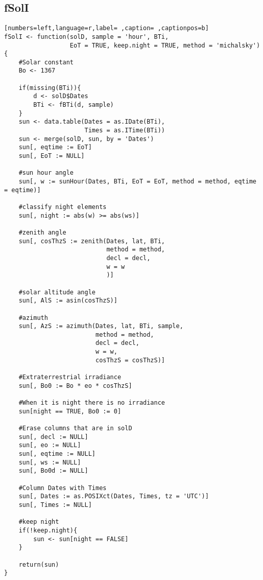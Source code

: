 \subsection{fSolI}
\label{sec:orgeeed9f3}
\begin{lstlisting}[numbers=left,language=r,label= ,caption= ,captionpos=b]
fSolI <- function(solD, sample = 'hour', BTi,
                  EoT = TRUE, keep.night = TRUE, method = 'michalsky')
{
    #Solar constant
    Bo <- 1367

    if(missing(BTi)){
        d <- solD$Dates
        BTi <- fBTi(d, sample)
    }
    sun <- data.table(Dates = as.IDate(BTi),
                      Times = as.ITime(BTi))
    sun <- merge(solD, sun, by = 'Dates')
    sun[, eqtime := EoT]
    sun[, EoT := NULL]

    #sun hour angle
    sun[, w := sunHour(Dates, BTi, EoT = EoT, method = method, eqtime = eqtime)]

    #classify night elements
    sun[, night := abs(w) >= abs(ws)]

    #zenith angle
    sun[, cosThzS := zenith(Dates, lat, BTi,
                            method = method,
                            decl = decl,
                            w = w
                            )]

    #solar altitude angle
    sun[, AlS := asin(cosThzS)]

    #azimuth
    sun[, AzS := azimuth(Dates, lat, BTi, sample,
                         method = method,
                         decl = decl, 
                         w = w,
                         cosThzS = cosThzS)]

    #Extraterrestrial irradiance
    sun[, Bo0 := Bo * eo * cosThzS]

    #When it is night there is no irradiance
    sun[night == TRUE, Bo0 := 0]

    #Erase columns that are in solD
    sun[, decl := NULL]
    sun[, eo := NULL]
    sun[, eqtime := NULL]
    sun[, ws := NULL]
    sun[, Bo0d := NULL]

    #Column Dates with Times
    sun[, Dates := as.POSIXct(Dates, Times, tz = 'UTC')]
    sun[, Times := NULL]

    #keep night
    if(!keep.night){
        sun <- sun[night == FALSE]
    }

    return(sun)
}
\end{lstlisting}
